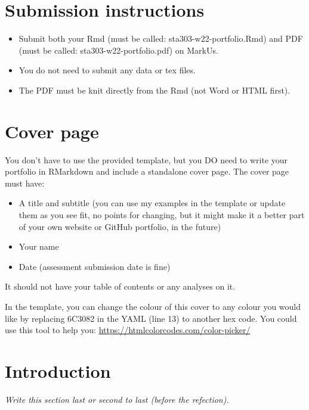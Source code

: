 \documentclass[
  openany]{book}
\providecommand{\tightlist}{%
  \setlength{\itemsep}{0pt}\setlength{\parskip}{0pt}}
\begin{document}
\hypertarget{submission-instructions-1}{%
\section{Submission instructions}\label{submission-instructions-1}}

\begin{itemize}
\tightlist
\item
  Submit both your Rmd (must be called: sta303-w22-portfolio.Rmd) and PDF (must be called: sta303-w22-portfolio.pdf) on MarkUs.
\item
  You do not need to submit any data or tex files.
\item
  The PDF must be knit directly from the Rmd (not Word or HTML first).
\end{itemize}

\hypertarget{cover-page-1}{%
\section{Cover page}\label{cover-page-1}}

You don't have to use the provided template, but you DO need to write your portfolio in RMarkdown and include a standalone cover page. The cover page must have:

\begin{itemize}
\item
  A title and subtitle (you can use my examples in the template or update them as you see fit, no points for changing, but it might make it a better part of your own website or GitHub portfolio, in the future)
\item
  Your name
\item
  Date (assessment submission date is fine)
\end{itemize}

It should not have your table of contents or any analyses on it.

In the template, you can change the colour of this cover to any colour you would like by replacing 6C3082 in the YAML (line 13) to another hex code. You could use this tool to help you: \url{https://htmlcolorcodes.com/color-picker/}

\hypertarget{introduction-1}{%
\section{Introduction}\label{introduction-1}}

\emph{Write this section last or second to last (before the refection).}
\end{document}
